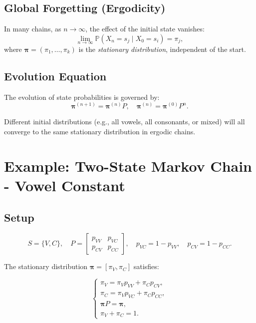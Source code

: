 \subsection{Global Forgetting (Ergodicity)}

In many chains, as $n \to \infty$, the effect of the initial state vanishes:
\[
\lim_{n \to \infty} \mathbb{P}(X_n = s_j \mid X_0 = s_i) = \pi_j,
\]
where $\boldsymbol{\pi} = (\pi_1, \dots, \pi_k)$ is the \emph{stationary distribution}, independent of the start.




\subsection{Evolution Equation}

The evolution of state probabilities is governed by:
\[
\boldsymbol{\pi}^{(n+1)} = \boldsymbol{\pi}^{(n)} P, \quad
\boldsymbol{\pi}^{(n)} = \boldsymbol{\pi}^{(0)} P^n.
\]

Different initial distributions (e.g., all vowels, all consonants, or mixed) will all converge to the same stationary distribution in ergodic chains.




\section{Example: Two-State Markov Chain - Vowel Constant}




\subsection{Setup}

\[
S = \{V, C\}, \quad
P =
\begin{bmatrix}
p_{VV} & p_{VC} \\
p_{CV} & p_{CC}
\end{bmatrix},
\quad
p_{VC} = 1 - p_{VV}, \quad
p_{CV} = 1 - p_{CC}.
\]

The stationary distribution $\boldsymbol{\pi} = [\pi_V, \pi_C]$ satisfies:

\[
\begin{cases}
\pi_V = \pi_V p_{VV} + \pi_C p_{CV}, \\
\pi_C = \pi_V p_{VC} + \pi_C p_{CC}, \\
\boldsymbol{\pi} P = \boldsymbol{\pi},\\ 
\pi_V + \pi_C = 1.
\end{cases}
\]

